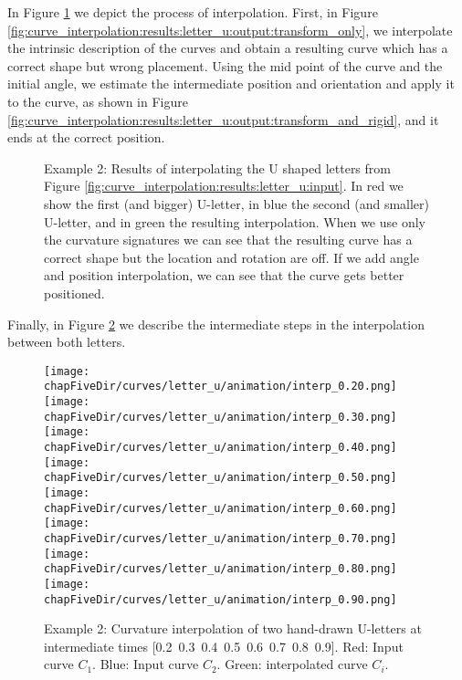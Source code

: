 \documentclass{ipol}
\newcommand{\chapFiveDir}{images/chapter_05a}
\renewcommand{\anchocuatro}{3.2cm}
\begin{document}
In Figure \ref{fig:curve_interpolation:results:letter_u:output} we depict the process of interpolation. First, in Figure \ref{fig:curve_interpolation:results:letter_u:output:transform_only}, we interpolate the intrinsic description of the curves and obtain a resulting curve which has a correct shape but wrong placement. Using the mid point of the curve and the initial angle, we estimate the intermediate position and orientation and apply it to the curve, as shown in Figure \ref{fig:curve_interpolation:results:letter_u:output:transform_and_rigid}, and it ends at the correct position.

\begin{figure}[h]
	\centering
	\caption{
		Example 2: Results of interpolating the U shaped letters from Figure \ref{fig:curve_interpolation:results:letter_u:input}. In red we show the first (and bigger) U-letter, in blue the second (and smaller) U-letter, and in green the resulting interpolation.
		\protect{} When we use only the curvature signatures we can see that the resulting curve has a correct shape but the location and rotation are off.
		\protect{} If we add angle and position interpolation, we can see that the curve gets better positioned.
	}
	\label{fig:curve_interpolation:results:letter_u:output}
\end{figure}	
%
Finally, in Figure \ref{fig:curve_interpolation:results:letter_u:animation} we describe the intermediate steps in the interpolation between both letters.
%
\begin{figure}[h]
	\centering
	\texttt{[image: \\chapFiveDir/curves/letter\_u/animation/interp\_0.20.png]}
	\texttt{[image: \\chapFiveDir/curves/letter\_u/animation/interp\_0.30.png]}
	\texttt{[image: \\chapFiveDir/curves/letter\_u/animation/interp\_0.40.png]}
	\texttt{[image: \\chapFiveDir/curves/letter\_u/animation/interp\_0.50.png]}\\
	\texttt{[image: \\chapFiveDir/curves/letter\_u/animation/interp\_0.60.png]}
	\texttt{[image: \\chapFiveDir/curves/letter\_u/animation/interp\_0.70.png]}
	\texttt{[image: \\chapFiveDir/curves/letter\_u/animation/interp\_0.80.png]}
	\texttt{[image: \\chapFiveDir/curves/letter\_u/animation/interp\_0.90.png]}
	\caption{Example 2: Curvature interpolation of two hand-drawn U-letters at intermediate times \mbox{[0.2 0.3 0.4 0.5 0.6 0.7 0.8 0.9]}. Red: Input curve $C_1$. Blue: Input curve $C_2$. Green: interpolated curve $C_i$. }
	\label{fig:curve_interpolation:results:letter_u:animation}
\end{figure}	
\end{document}
